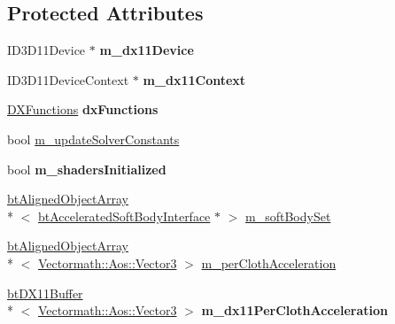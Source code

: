 \subsection*{Protected Attributes}
\begin{DoxyCompactItemize}
\item 
\hypertarget{classbt_d_x11_soft_body_solver_a6c4b7fd4c022a851fee420c58417724d}{I\+D3\+D11\+Device $\ast$ {\bfseries m\+\_\+dx11\+Device}}\label{classbt_d_x11_soft_body_solver_a6c4b7fd4c022a851fee420c58417724d}

\item 
\hypertarget{classbt_d_x11_soft_body_solver_a87814bfd23e6856a198330549eb7b850}{I\+D3\+D11\+Device\+Context $\ast$ {\bfseries m\+\_\+dx11\+Context}}\label{classbt_d_x11_soft_body_solver_a87814bfd23e6856a198330549eb7b850}

\item 
\hypertarget{classbt_d_x11_soft_body_solver_a5e4e8a4bd7edb29d3de843fd2a93b0d3}{\hyperlink{class_d_x_functions}{D\+X\+Functions} {\bfseries dx\+Functions}}\label{classbt_d_x11_soft_body_solver_a5e4e8a4bd7edb29d3de843fd2a93b0d3}

\item 
bool \hyperlink{classbt_d_x11_soft_body_solver_a15ab079a7dde751958b96341c4bcb08b}{m\+\_\+update\+Solver\+Constants}
\item 
\hypertarget{classbt_d_x11_soft_body_solver_a29a347f3de2f18c00645f5258e519b8d}{bool {\bfseries m\+\_\+shaders\+Initialized}}\label{classbt_d_x11_soft_body_solver_a29a347f3de2f18c00645f5258e519b8d}

\item 
\hyperlink{classbt_aligned_object_array}{bt\+Aligned\+Object\+Array}\\*
$<$ \hyperlink{classbt_d_x11_soft_body_solver_1_1bt_accelerated_soft_body_interface}{bt\+Accelerated\+Soft\+Body\+Interface} $\ast$ $>$ \hyperlink{classbt_d_x11_soft_body_solver_af47b0c45db2b0cb04736c11d2535d1c7}{m\+\_\+soft\+Body\+Set}
\item 
\hyperlink{classbt_aligned_object_array}{bt\+Aligned\+Object\+Array}\\*
$<$ \hyperlink{class_vectormath_1_1_aos_1_1_vector3}{Vectormath\+::\+Aos\+::\+Vector3} $>$ \hyperlink{classbt_d_x11_soft_body_solver_a78b69812eb1dad36cc177d2b5b22dd15}{m\+\_\+per\+Cloth\+Acceleration}
\item 
\hypertarget{classbt_d_x11_soft_body_solver_a6f9aebea26828b6ca082c65c96139498}{\hyperlink{classbt_d_x11_buffer}{bt\+D\+X11\+Buffer}\\*
$<$ \hyperlink{class_vectormath_1_1_aos_1_1_vector3}{Vectormath\+::\+Aos\+::\+Vector3} $>$ {\bfseries m\+\_\+dx11\+Per\+Cloth\+Acceleration}}\label{classbt_d_x11_soft_body_solver_a6f9aebea26828b6ca082c65c96139498}


\end{DoxyCompactItemize}
